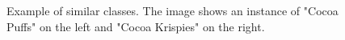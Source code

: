 \begin{figure}[H]
	\centering
    \qquad
    \caption{Example of similar classes. The image shows an instance of "Cocoa Puffs" on the left and "Cocoa Krispies" on the right.}
	\label{fig:exp-cm-similar}
\end{figure}

